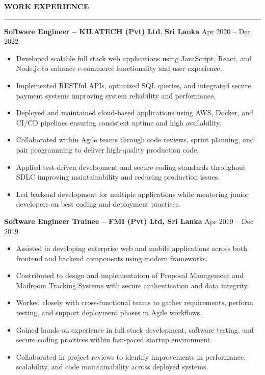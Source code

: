 \documentclass[10pt,letterpaper]{article}
\begin{document}
\vspace{8pt}

\textbf{WORK EXPERIENCE}\\[-8pt]
\noindent\rule{\textwidth}{1pt}

\vspace{-2pt}

\textbf{Software Engineer -- KILATECH (Pvt) Ltd}, \textbf{Sri Lanka} \hfill Apr 2020 -- Dec 2022

\vspace{-1pt}

\begin{itemize}
\item Developed scalable full stack web applications using JavaScript, React, and Node.js to enhance e-commerce functionality and user experience.
\item Implemented RESTful APIs, optimized SQL queries, and integrated secure payment systems improving system reliability and performance.
\item Deployed and maintained cloud-based applications using AWS, Docker, and CI/CD pipelines ensuring consistent uptime and high availability.
\item Collaborated within Agile teams through code reviews, sprint planning, and pair programming to deliver high-quality production code.
\item Applied test-driven development and secure coding standards throughout SDLC improving maintainability and reducing production issues.
\item Led backend development for multiple applications while mentoring junior developers on best coding and deployment practices.
\end{itemize}

\textbf{Software Engineer Trainee -- FMI (Pvt) Ltd, Sri Lanka} \hfill Apr 2019 -- Dec 2019

\vspace{-1pt}

\begin{itemize}
\item Assisted in developing enterprise web and mobile applications across both frontend and backend components using modern frameworks.
\item Contributed to design and implementation of Proposal Management and Mailroom Tracking Systems with secure authentication and data integrity.
\item Worked closely with cross-functional teams to gather requirements, perform testing, and support deployment phases in Agile workflows.
\item Gained hands-on experience in full stack development, software testing, and secure coding practices within fast-paced startup environment.
\item Collaborated in project reviews to identify improvements in performance, scalability, and code maintainability across deployed systems.
\end{itemize}
\end{document}

